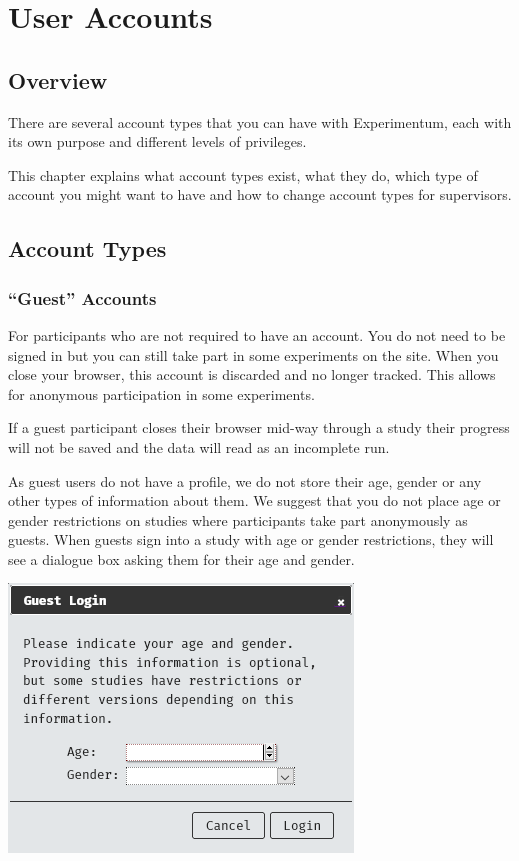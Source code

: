 \documentclass[]{book}
\begin{document}
\hypertarget{accounts}{%
\chapter{User Accounts}\label{accounts}}

\hypertarget{overview}{%
\section{Overview}\label{overview}}

There are several account types that you can have with Experimentum, each with its own purpose and different levels of privileges.

This chapter explains what account types exist, what they do, which type of account you might want to have and how to change account types for supervisors.

\hypertarget{account-types}{%
\section{Account Types}\label{account-types}}

\hypertarget{guest-accounts}{%
\subsection{``Guest'' Accounts}\label{guest-accounts}}

For participants who are not required to have an account. You do not need to be signed in but you can still take part in some experiments on the site. When you close your browser, this account is discarded and no longer tracked. This allows for anonymous participation in some experiments.

\begin{warning}
If a guest participant closes their browser mid-way through a study
their progress will not be saved and the data will read as an incomplete
run.
\end{warning}

As guest users do not have a profile, we do not store their age, gender or any other types of information about them. We suggest that you do not place age or gender restrictions on studies where participants take part anonymously as guests. When guests sign into a study with age or gender restrictions, they will see a dialogue box asking them for their age and gender.

\includegraphics{images/screenshots/guest_dialogue.png}
\end{document}
